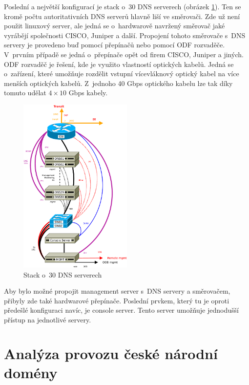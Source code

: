 \documentclass[thesis=M,czech]{src/FITthesis}[2019/12/23]
\begin{document}
Poslední a největší konfigurací je stack o~30 DNS serverech (obrázek \ref{fig:infra-30stack}). Ten se kromě počtu autoritativních DNS serverů hlavně liší ve směrovači. Zde už není použit linuxový server, ale jedná se o~hardwarově navržený směrovač jaké vyrábějí společnosti CISCO, Juniper a další. Propojení tohoto směrovače s~DNS servery je provedeno buď pomocí přepínačů nebo pomocí ODF rozvaděče. V~prvním případě se jedná o~přepínače opět od firem CISCO, Juniper a jiných. ODF rozvaděč je řešení, kde je využito vlastností optických kabelů. Jedná se o~zařízení, které umožňuje rozdělit vstupní vícevláknový optický kabel na více menších optických kabelů. Z~jednoho 40 Gbps optického kabelu lze tak díky tomuto udělat $4\times10$ Gbps kabely. 

\begin{figure}[ht]
  \centering
   \includegraphics[width=0.5\textwidth]{images/infrastructure-30stack.pdf}
   \caption{Stack o~30 DNS serverech}
     \label{fig:infra-30stack}
\end{figure}

Aby bylo možné propojit management server s~DNS servery a směrovačem, přibyly zde také hardwarové přepínače. Poslední prvkem, který tu je oproti předešlé konfiguraci navíc, je console server. Tento server umožňuje jednodušší přístup na jednotlivé servery. 



\section{Analýza provozu české národní domény}
\end{document}
